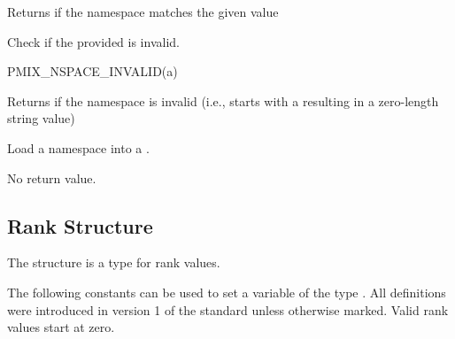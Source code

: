 Returns  if the namespace matches the given value


Check if the provided  is invalid.

\cspecificstart
\begin{codepar}
PMIX_NSPACE_INVALID(a)
\end{codepar}
\cspecificend

\begin{arglist}
\end{arglist}

Returns  if the namespace is invalid (i.e., starts with a  resulting in a zero-length string value)


Load a namespace into a .


\begin{arglist}
\end{arglist}

No return value.


\subsection{Rank Structure}

The  structure is a  type for rank values.


The following constants can be used to set a variable of the type . All definitions were introduced in version 1 of the standard unless otherwise marked. Valid rank values start at zero.

